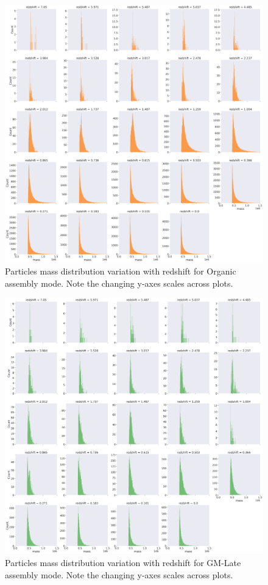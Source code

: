 \documentclass{article}
\begin{document}
	\begin{figure}
			\centering 
			\includegraphics[width=.9\columnwidth]{../plots/mass_distribution_wrt_redshift_Organic.png}
			\caption{Particles mass distribution variation with redshift for Organic assembly mode. Note the changing y-axes scales across plots.}
	\end{figure}

	\clearpage

	\begin{figure}
			\centering 
			\includegraphics[width=.9\columnwidth]{../plots/mass_distribution_wrt_redshift_GM-Late.png}
			\caption{Particles mass distribution variation with redshift for GM-Late assembly mode. Note the changing y-axes scales across plots.}
	\end{figure}
\end{document}
